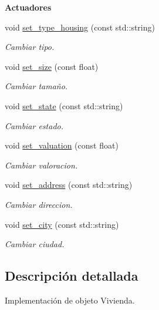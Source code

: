 \begin{Indent}{\bf Actuadores}\par
\begin{DoxyCompactItemize}
\item 
void \hyperlink{class_c_housing_aa3d4063bf93f2cdbddd9ae16f0363893}{set\+\_\+type\+\_\+housing} (const std\+::string)
\begin{DoxyCompactList}\small\item\em Cambiar tipo. \end{DoxyCompactList}\item 
void \hyperlink{class_c_housing_ab6a8eaa28937e9728c939d54f1f101c8}{set\+\_\+size} (const float)
\begin{DoxyCompactList}\small\item\em Cambiar tamaño. \end{DoxyCompactList}\item 
void \hyperlink{class_c_housing_ab8ef7d502de4f36057639debd22a5d32}{set\+\_\+state} (const std\+::string)
\begin{DoxyCompactList}\small\item\em Cambiar estado. \end{DoxyCompactList}\item 
void \hyperlink{class_c_housing_a6542b420e5405667818649fc6a4131fc}{set\+\_\+valuation} (const float)
\begin{DoxyCompactList}\small\item\em Cambiar valoracion. \end{DoxyCompactList}\item 
void \hyperlink{class_c_housing_a340ba44629ad45a5739af0a5f79c78da}{set\+\_\+address} (const std\+::string)
\begin{DoxyCompactList}\small\item\em Cambiar direccion. \end{DoxyCompactList}\item 
void \hyperlink{class_c_housing_abc5cac82dfc78666381d49e6aa3140fb}{set\+\_\+city} (const std\+::string)
\begin{DoxyCompactList}\small\item\em Cambiar ciudad. \end{DoxyCompactList}\end{DoxyCompactItemize}
\end{Indent}


\subsection{Descripción detallada}
Implementación de objeto Vivienda. 

